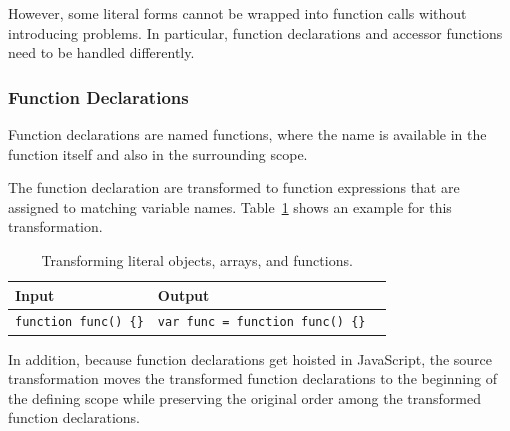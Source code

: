 However, some literal forms cannot be wrapped into function calls without introducing problems.
In particular, function declarations and accessor functions need to be handled differently.


\subsubsection{Function Declarations}


Function declarations are named functions, where the name is available in the function itself and also in the surrounding scope.



The function declaration are transformed to function expressions that are assigned to matching variable names.
Table~\ref{table:funcTransform} shows an example for this transformation.

\begin{table}[h]
\begin{center}
\begin{tabular}{| l | l | l |}
\hline
Input & Output \\ \hline
\lstinline|function func() {}| & \lstinline|var func = function func() {}| \\ \hline
\end{tabular}
\end{center}
\caption[Table caption text]{Transforming literal objects, arrays, and functions.}
\label{table:funcTransform}
\end{table}

In addition, because function declarations get hoisted in JavaScript, the source transformation moves the transformed function declarations to the beginning of the defining scope while preserving the original order among the transformed function declarations.


